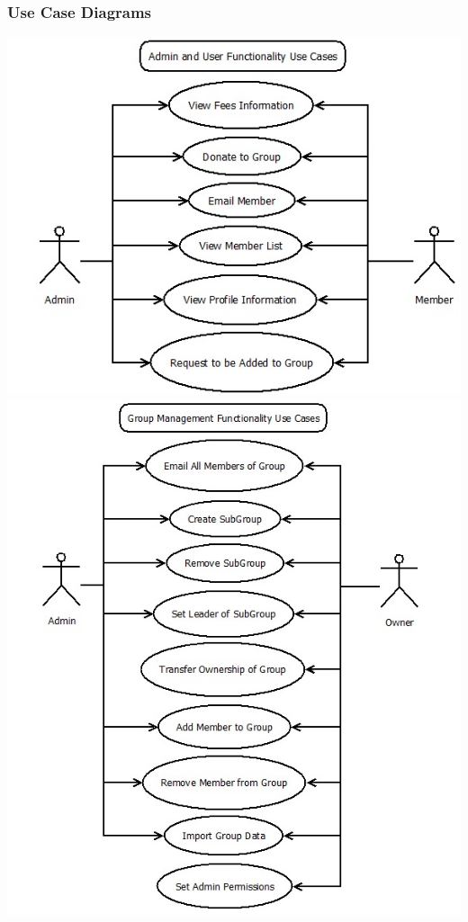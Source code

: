 \documentclass[12pt]{report}
\begin{document}
  \subsubsection{Use Case Diagrams}
    \includegraphics{AdminUser_UseCase} \\[1.0cm]
    \includegraphics{GroupManagement_UseCase} \\[1.0cm]
\end{document}

